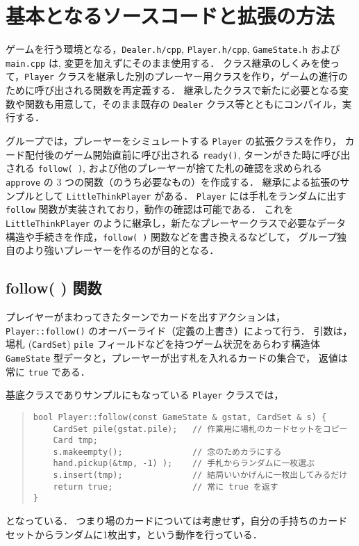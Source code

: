 \section{基本となるソースコードと拡張の方法}
ゲームを行う環境となる，\verb+Dealer.h/cpp+, \verb+Player.h/cpp+, \verb+GameState.h+ および \verb+main.cpp+ は, 変更を加えずにそのまま使用する．
クラス継承のしくみを使って，\verb+Player+ クラスを継承した別のプレーヤー用クラスを作り，ゲームの進行のために呼び出される関数を再定義する．
継承したクラスで新たに必要となる変数や関数も用意して，そのまま既存の \verb+Dealer+ クラス等とともにコンパイル，実行する．

グループでは，プレーヤーをシミュレートする \verb+Player+ の拡張クラスを作り，
カード配付後のゲーム開始直前に呼び出される \verb+ready()+, ターンがきた時に呼び出される \verb+follow( )+, および他のプレーヤーが捨てた札の確認を求められる \verb+approve+ の 3 つの関数（のうち必要なもの）を作成する．
継承による拡張のサンプルとして \verb+LittleThinkPlayer+ がある．
\verb+Player+ には手札をランダムに出す \verb+follow+ 関数が実装されており，動作の確認は可能である．
これを \verb+LittleThinkPlayer+ のように継承し，新たなプレーヤークラスで必要なデータ構造や手続きを作成，\verb+follow( )+ 関数などを書き換えるなどして，
グループ独自のより強いプレーヤーを作るのが目的となる．

\subsection{follow( ) 関数}
プレイヤーがまわってきたターンでカードを出すアクションは，\verb+Player::follow()+ のオーバーライド（定義の上書き）によって行う．
引数は，場札 (\verb+CardSet+) \verb+pile+ フィールドなどを持つゲーム状況をあらわす構造体 \verb+GameState+ 型データと，プレーヤーが出す札を入れるカードの集合で，
返値は常に \verb+true+ である．

基底クラスでありサンプルにもなっている \verb+Player+ クラスでは，
\begin{quote}
\begin{verbatim}
bool Player::follow(const GameState & gstat, CardSet & s) {
    CardSet pile(gstat.pile);   // 作業用に場札のカードセットをコピー
    Card tmp;
    s.makeempty();              // 念のためカラにする
    hand.pickup(&tmp, -1) );    // 手札からランダムに一枚選ぶ
    s.insert(tmp);              // 結局いいかげんに一枚出してみるだけ
    return true;                // 常に true を返す
}
\end{verbatim}
\end{quote}
となっている．
つまり場のカードについては考慮せず，自分の手持ちのカードセットからランダムに1枚出す，という動作を行っている．

